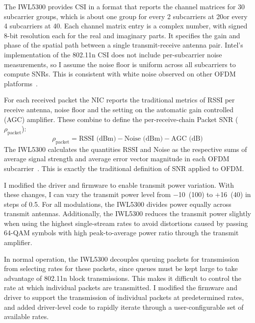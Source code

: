 The IWL5300 provides CSI in a format that reports the channel matrices for 30 subcarrier groups, which is about one group for every 2 subcarriers at 20\MHz or every 4 subcarriers at 40\MHz. Each channel matrix entry is a complex number, with signed 8-bit resolution each for the real and imaginary parts. It specifies the gain and phase of the spatial path between a single transmit-receive antenna pair. Intel's implementation of the 802.11n CSI does not include per-subcarrier noise measurements, so I assume the noise floor is uniform across all subcarriers to compute SNRs. This is consistent with white noise observed on other OFDM platforms~\cite{Rahul_FARA}.

For each received packet the NIC reports the traditional metrics of RSSI per receive antenna, noise floor and the setting on the automatic gain controlled (AGC) amplifier. These combine to define the per-receive-chain Packet SNR ($\rho_{\text{packet}}$):
\begin{equation}
\label{eq:per_chain_snr}
	\rho_{\text{packet}} = \text{RSSI (dBm)} - \text{Noise (dBm)} - \text{AGC (dB)}
\end{equation}
The IWL5300 calculates the quantities RSSI and Noise as the respective sums of average signal strength and average error vector magnitude in each OFDM subcarrier~\cite{iwlwifi}. This is exactly the traditional definition of SNR applied to OFDM.

 I modified the driver and firmware to enable transmit power variation. With these changes, I can vary the transmit power level from $-$10\dBm~(100\uW) to $+$16\dBm~(40\mW) in steps of 0.5\dB. For all modulations, the IWL5300 divides power equally across transmit antennas. Additionally, the IWL5300 reduces the transmit power slightly when using the highest single-stream rates to avoid distortions caused by passing 64-QAM symbols with high peak-to-average power ratio through the transmit amplifier.

 In normal operation, the IWL5300 decouples queuing packets for transmission from selecting rates for these packets, since queues must be kept large to take advantage of 802.11n block transmissions. This makes it difficult to control the rate at which individual packets are transmitted. I modified the firmware and driver to support the transmission of individual packets at predetermined rates, and added driver-level code to rapidly iterate through a user-configurable set of available rates.

